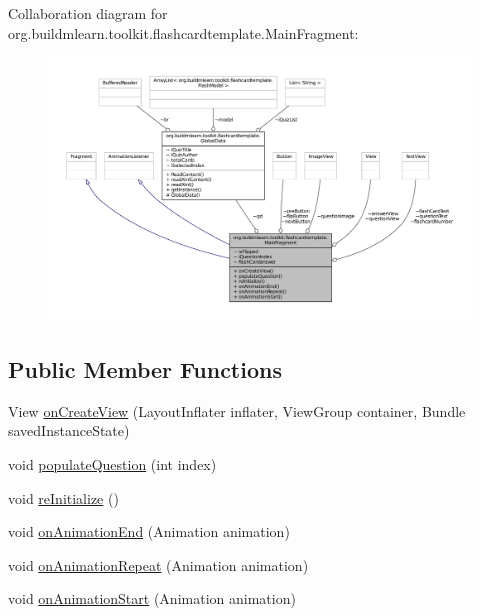 Collaboration diagram for org.\-buildmlearn.\-toolkit.\-flashcardtemplate.\-Main\-Fragment\-:
\nopagebreak
\begin{figure}[H]
\begin{center}
\leavevmode
\includegraphics[width=350pt]{d4/daf/classorg_1_1buildmlearn_1_1toolkit_1_1flashcardtemplate_1_1MainFragment__coll__graph}
\end{center}
\end{figure}
\subsection*{Public Member Functions}
\begin{DoxyCompactItemize}
\item 
View \hyperlink{classorg_1_1buildmlearn_1_1toolkit_1_1flashcardtemplate_1_1MainFragment_a4a45ac52c1f059e73b6428c8e6497ce2}{on\-Create\-View} (Layout\-Inflater inflater, View\-Group container, Bundle saved\-Instance\-State)
\item 
void \hyperlink{classorg_1_1buildmlearn_1_1toolkit_1_1flashcardtemplate_1_1MainFragment_a4cbd053b83f6e1d0296a7d60639dfd8d}{populate\-Question} (int index)
\item 
void \hyperlink{classorg_1_1buildmlearn_1_1toolkit_1_1flashcardtemplate_1_1MainFragment_ae9e2c735c811355694eb801713f4d900}{re\-Initialize} ()
\item 
void \hyperlink{classorg_1_1buildmlearn_1_1toolkit_1_1flashcardtemplate_1_1MainFragment_a3bf2edf287b796f71a8e2501b7e0d096}{on\-Animation\-End} (Animation animation)
\item 
void \hyperlink{classorg_1_1buildmlearn_1_1toolkit_1_1flashcardtemplate_1_1MainFragment_ad63767eb4d6d68f4e85c64ccc719da37}{on\-Animation\-Repeat} (Animation animation)
\item 
void \hyperlink{classorg_1_1buildmlearn_1_1toolkit_1_1flashcardtemplate_1_1MainFragment_a4fe7d6269f507e5485fe13d036b4f152}{on\-Animation\-Start} (Animation animation)
\end{DoxyCompactItemize}


